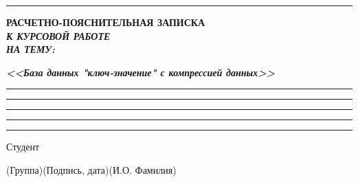 \documentclass[14pt, russian]{scrartcl}
\begin{document}
\begin{titlepage}
\vspace*{-16pt}
\hspace{25pt}\rule{0.875\textwidth}{0.4pt}
 
 
\vspace{3em}
 
\begin{center}
\Large \bf{РАСЧЕТНО-ПОЯСНИТЕЛЬНАЯ ЗАПИСКА\\\textbf{\textit{К КУРСОВОЙ РАБОТЕ\\НА ТЕМУ:}} \\}
\end{center}

\vspace*{-6ex} 
\begin{center}
\Large{\textit{\textbf{<<База данных "ключ-значение" с компрессией данных>>}}}

\vspace*{-3ex}
\rule{0.9\textwidth}{1.2pt}

\vspace*{-0.2ex}
\rule{0.9\textwidth}{1.2pt}

\vspace*{-0.2ex}
\rule{0.9\textwidth}{1.2pt}

\vspace*{-0.2ex}
\rule{0.9\textwidth}{1.2pt}

\vspace*{-0.2ex}
\rule{0.9\textwidth}{1.2pt}
\end{center}
 
\vspace{\fill}
 

\newlength{\ML}

\noindent Студент \underline{\hspace{1.5cm}} \hfill \underline{\hspace{4cm}}\quad
\underline{\hspace{4cm}}

\vspace{-2.1ex}
\noindent\hspace{9ex}\scriptsize{(Группа)}\normalsize\hspace{170pt}\hspace{2ex}\scriptsize{(Подпись, дата)}\normalsize\hspace{30pt}\hspace{6ex}\scriptsize{(И.О. Фамилия)}\normalsize


\end{titlepage}
\end{document}

